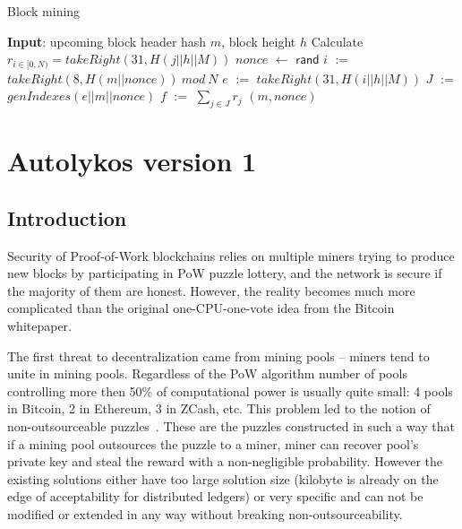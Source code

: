 \documentclass[]{article}
\def\Let#1#2{\State #1 $:=$ #2}
\def\LetRnd#1#2{\State #1 $\gets$ #2}
\begin{document}
    \begin{algorithm}[H]
        \caption{Block mining}
        \label{alg:prove2}
        \begin{algorithmic}[1]
            \State \textbf{Input}: upcoming block header hash $m$, block height $h$
            \State Calculate $r_{i \in [0,N)} = takeRight(31, H(j || h || M))$
            \LetRnd{$nonce$}{$\mathsf{rand}$}
            \Let{$i$}{$takeRight(8, H(m || nonce))\ mod\ N$}
            \Let{$e$}{$takeRight(31, H(i || h || M))$}
            \Let{$J$}{$genIndexes(e || m || nonce)$}
            \Let{$f$}{$\sum_{j \in J}{r_j}$}
            \State \Return $(m, nonce)$
            \EndIf
            \EndWhile
        \end{algorithmic}
    \end{algorithm}



    \section{Autolykos version 1}
    \label{av1}

    \subsection{Introduction}

    Security of Proof-of-Work blockchains relies
    on multiple miners trying to produce new blocks by
    participating in PoW puzzle lottery, and the network is secure if the
    majority of them are honest. However, the reality becomes much more complicated
    than the original one-CPU-one-vote idea from the Bitcoin whitepaper\cite{nakamoto2008bitcoin}.

    The first threat to decentralization came from mining pools -- miners tend
    to unite in mining pools.
    Regardless of the PoW algorithm number of pools controlling more then 50\% of
    computational power is usually quite small: 4 pools in Bitcoin, 2 in Ethereum, 3 in ZCash, etc.
    This problem led to the notion of non-outsourceable puzzles~\cite{miller2015nonoutsourceable,daian2017piecework}.
    These are the puzzles constructed in such a way that if a mining pool outsources the puzzle
    to a miner, miner can recover pool's private key and steal the reward with a non-negligible probability.
    However the existing solutions either have too large solution size (kilobyte is already
    on the edge of acceptability for distributed ledgers) or very specific and
    can not be modified or extended in any way without breaking non-outsourceability.
\end{document}
